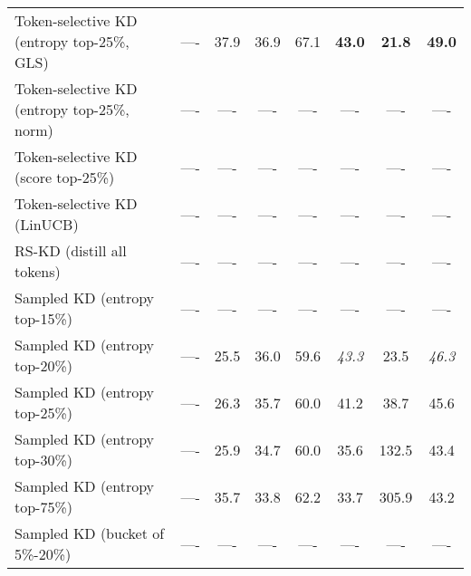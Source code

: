 \documentclass[11pt]{article}
\begin{document}
\begin{table*}[t]
{\begin{tabular}{lccccccc}
		Token-selective KD (entropy top-25\%, GLS) & ----    & 37.9                  & 36.9                      & 67.1                 & \textbf{43.0}               & \textbf{21.8}           & \textbf{49.0} \\
		Token-selective KD (entropy top-25\%, norm)& ----    & ----                  & ----                      & ----                 & ----                        & ----                    & ----          \\
		Token-selective KD (score top-25\%)        & ----    & ----                  & ----                      & ----                 & ----                        & ----                    & ----          \\
		Token-selective KD (LinUCB)			       & ----    & ----                  & ----                      & ----                 & ----                        & ----                    & ----          \\
   		\midrule
   		RS-KD (distill all tokens)	               & ----    & ----                  & ----                      & ----                 & ----                        & ----                    & ----          \\
		Sampled KD (entropy top-15\%)              & ----    & ----                  & ----                      & ----                 & ----                        & ----                    & ----          \\
		Sampled KD (entropy top-20\%)              & ----    & 25.5                  & 36.0                      & 59.6                 & \textit{43.3}               & 23.5                    & \textit{46.3} \\
		Sampled KD (entropy top-25\%)              & ----    & 26.3                  & 35.7                      & 60.0                 & 41.2                        & 38.7                    & 45.6          \\
		Sampled KD (entropy top-30\%)              & ----    & 25.9                  & 34.7                      & 60.0                 & 35.6                        & 132.5                   & 43.4          \\
		Sampled KD (entropy top-75\%)              & ----    & 35.7                  & 33.8                      & 62.2                 & 33.7                        & 305.9                   & 43.2          \\
		Sampled KD (bucket of 5\%-20\%)  		   & ----    & ----                  & ----                      & ----                 & ----                        & ----                    & ----          \\

\end{tabular}}
\end{table*}
\end{document}

